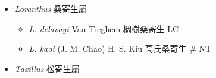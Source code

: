 
  \begin{itemize}
 \item[] \textit{Loranthus} 桑寄生屬
                                
  \begin{itemize}
        \item[] \textit{L. delavayi} Van Tieghem  椆樹桑寄生   LC
        \item[] \textit{L. kaoi} (J. M. Chao) H. S. Kiu  高氏桑寄生  \# NT
  \end{itemize}
 \item[] \textit{Taxillus} 松寄生屬
                                

\end{itemize}
